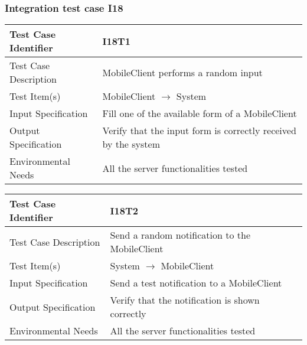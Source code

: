 		\subsubsection{Integration test case I18}
		\begin{center}
			\begin{tabular}{ |l p{10cm}| } \hline
				Test Case Identifier & I18T1 \\ \hline
				Test Case Description & MobileClient performs a random input \\ \hline
				Test Item(s) & MobileClient $\rightarrow$ System \\ \hline
				Input Specification & Fill one of the available form of a MobileClient \\ \hline
				Output Specification & Verify that the input form is correctly received by the system \\ \hline
				Environmental Needs & All the server functionalities tested \\ \hline
			\end{tabular}
		\end{center}
		\begin{center}
			\begin{tabular}{ |l p{10cm}| } \hline
				Test Case Identifier & I18T2 \\ \hline
				Test Case Description & Send a random notification to the MobileClient \\ \hline
				Test Item(s) & System $\rightarrow$ MobileClient \\ \hline
				Input Specification & Send a test notification to a MobileClient \\ \hline
				Output Specification & Verify that the notification is shown correctly \\ \hline
				Environmental Needs & All the server functionalities tested \\ \hline
			\end{tabular}
		\end{center}
